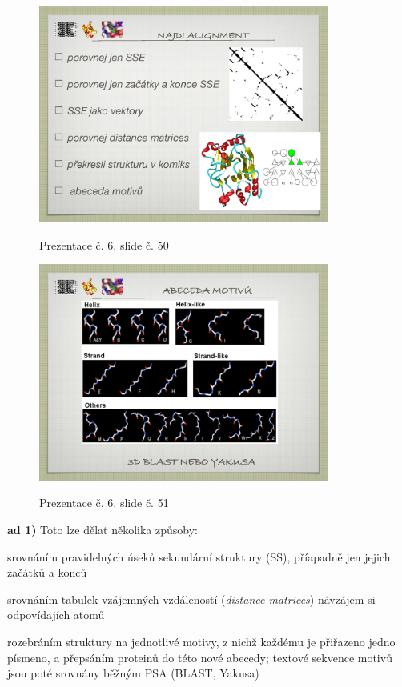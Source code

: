 \documentclass[DIV=8]{scrreprt}
\begin{document}
\begin{figure}
    \caption{Prezentace č. 6, slide č. 50}
    \includegraphics[width=0.85\textwidth]{slides-6/slide-50.jpg}
    \centering
    \label{slides-6-slide-50}
\end{figure}
\begin{figure}
    \caption{Prezentace č. 6, slide č. 51}
    \includegraphics[width=0.85\textwidth]{slides-6/slide-51.jpg}
    \centering
    \label{slides-6-slide-51}
\end{figure}

\textbf{ad 1)} Toto lze dělat několika způsoby:
\begin{myItemize}[nosep]
    \item srovnáním pravidelných úseků sekundární struktury (SS), příapadně jen jejich začátků a konců
    \item srovnáním tabulek vzájemných vzdáleností (\emph{distance matrices}) návzájem si odpovídajích atomů
    \item rozebráním struktury na jednotlivé motivy, z nichž každému je přiřazeno jedno písmeno, a přepsáním proteinů do této nové abecedy; textové sekvence motivů jsou poté srovnány běžným PSA (BLAST, Yakusa)
\end{myItemize}
\end{document}

